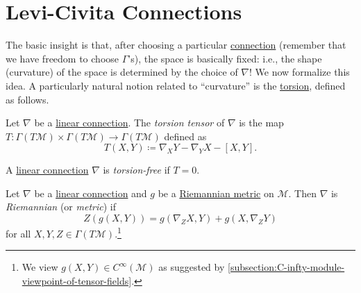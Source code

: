 \section{Levi-Civita Connections}
The basic insight is that, after choosing a particular \hyperref[def:linear-connection]{connection} (remember that we have freedom to choose \(\Gamma \)'s), the space is basically fixed: i.e., the shape (curvature) of the space is determined by the choice of \(\nabla \)! We now formalize this idea. A particularly natural notion related to ``curvature'' is the \hyperref[def:torsion-tensor]{torsion}, defined as follows.

\begin{definition}\label{def:torsion-tensor}
	Let \(\nabla \) be a \hyperref[def:linear-connection]{linear connection}. The \emph{torsion tensor} of \(\nabla \) is the map \(T\colon \Gamma (T \mathcal{M} )\times \Gamma (T \mathcal{M} )\to \Gamma (T \mathcal{M} )\) defined as
	\[
		T(X, Y) \coloneqq \nabla _X Y - \nabla _Y X - [X, Y].
	\]
\end{definition}

\begin{definition}\label{def:torsion-free}
	A \hyperref[def:linear-connection]{linear connection} \(\nabla \) is \emph{torsion-free} if \(T = 0\).
\end{definition}

\begin{definition}[Riemannian]\label{def:Riemannian}
	Let \(\nabla \) be a \hyperref[def:linear-connection]{linear connection} and \(g\) be a \hyperref[def:Riemannian-metric]{Riemannian metric} on \(\mathcal{M} \). Then \(\nabla \) is \emph{Riemannian} (or \emph{metric}) if
	\[
		Z(g(X, Y)) = g(\nabla _{Z} X, Y) + g(X, \nabla _{Z} Y)
	\]
	for all \(X, Y, Z\in \Gamma (T\mathcal{M} )\).\footnote{We view \(g(X, Y)\in C^{\infty} (\mathcal{M} )\) as suggested by \autoref{subsection:C-infty-module-viewpoint-of-tensor-fields}.}
\end{definition}

